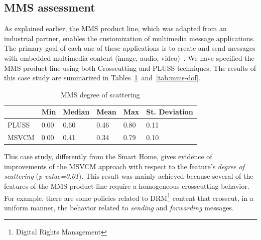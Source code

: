 


\subsection{MMS assessment}

As explained earlier, the MMS product line, which was adapted from an industrial
partner, enables the customization of multimedia message applications. The
primary goal of each one of these applications is to create and send messages
with embedded multimedia content (image, audio, video)~\cite{Bonifacio:2008aa}.
We have specified the MMS product line using both Crosscutting and PLUSS
techniques. The results of this case study are
summarized in Tables~\ref{tab:mms-dos}~and~\ref{tab:mms-dof}.

\begin{table}[htb] \centering
\caption{MMS degree of scattering}
\label{tab:mms-dos}
\begin{small}
\begin{tabular}{llllll} \hline
					& Min 	& Median 	& Mean 	& Max 	& St. Deviation \\ \hline 
	PLUSS			& 0.00  & 0.60   	& 0.46  & 0.80 	& 0.11 			\\
	MSVCM			& 0.00  & 0.41   	& 0.34 	& 0.79 	& 0.10			\\ \hline	
\end{tabular}
\end{small}
\end{table}

This case study, differently from the Smart Home, gives evidence of improvements of the
MSVCM approach with respect to the feature's \emph{degree of scattering}
(\emph{p-value=0.01}). This result was mainly achieved because several of the features of
the MMS product line require a homogeneous crosscutting behavior. For example,
there are some policies related to DRM\footnote{Digital Rights Management}
content that crosscut, in a uniform manner, the behavior related to
\emph{sending} and \emph{forwarding} messages.

